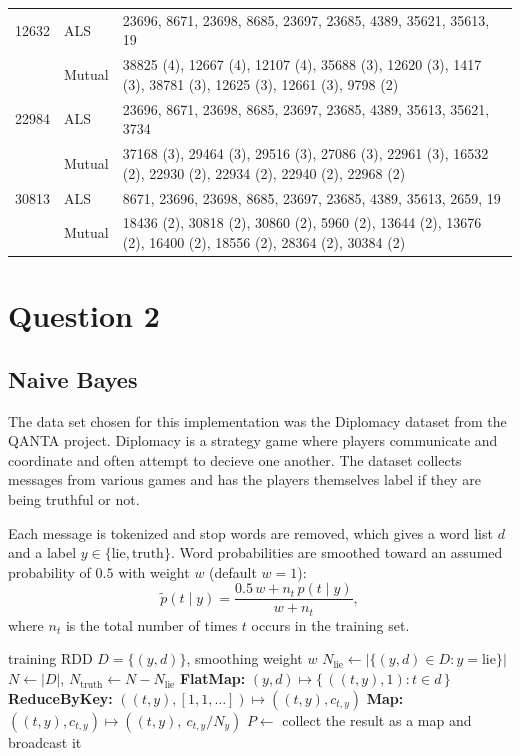\documentclass[11pt]{article}
\begin{document}
{\begin{longtable}{|r|l|p{}|}
    12632 & ALS & 23696, 8671, 23698, 8685, 23697, 23685, 4389,
    35621, 35613, 19 \\
    & Mutual & 38825 (4), 12667 (4), 12107 (4), 35688 (3), 12620 (3),
    1417 (3), 38781 (3), 12625 (3), 12661 (3), 9798 (2) \\ \hline
    22984 & ALS & 23696, 8671, 23698, 8685, 23697, 23685, 4389,
    35613, 35621, 3734 \\
    & Mutual & 37168 (3), 29464 (3), 29516 (3), 27086 (3), 22961 (3),
    16532 (2), 22930 (2), 22934 (2), 22940 (2), 22968 (2) \\ \hline
    30813 & ALS & 8671, 23696, 23698, 8685, 23697, 23685, 4389,
    35613, 2659, 19 \\
    & Mutual & 18436 (2), 30818 (2), 30860 (2), 5960 (2), 13644 (2),
    13676 (2), 16400 (2), 18556 (2), 28364 (2), 30384 (2) \\ \hline
  \end{longtable}
}

\section{Question 2}

\subsection*{Naive Bayes}
The data set chosen for this implementation was the Diplomacy dataset
from the QANTA project. Diplomacy is a strategy game where players
communicate and coordinate and often attempt to decieve one another.
The dataset collects messages from various games and has the players
themselves label if they are being truthful or not.

Each message is tokenized and stop words are removed, which gives a
word list $d$ and a label $y \in \{\text{lie}, \text{truth}\}$.
Word probabilities are smoothed toward an assumed probability of
$0.5$ with weight $w$ (default $w = 1$):
\[
  \tilde{p}(t \mid y) = \frac{0.5\,w + n_t\, p(t \mid y)}{w + n_t},
\]
where $n_t$ is the total number of times $t$ occurs in the training set.

\begin{algorithm}[H]
  \caption{\textsc{Fit}$(D, w)$}
  \begin{algorithmic}[1]
    \REQUIRE training RDD $D = \{(y, d)\}$, smoothing weight $w$
    \STATE $N_{\text{lie}} \leftarrow |\{(y, d) \in D : y = \text{lie}\}|$
    \STATE $N \leftarrow |D|$, \quad $N_{\text{truth}} \leftarrow N -
    N_{\text{lie}}$
    \STATE \textbf{FlatMap:} $(y, d) \mapsto \{\, ((t, y), 1) : t \in d \,\}$
    \STATE \textbf{ReduceByKey:} $((t, y), [1, 1, \dots]) \mapsto
    ((t, y), c_{t,y})$
    \STATE \textbf{Map:} $((t, y), c_{t,y}) \mapsto ((t, y),\ c_{t,y}
    / N_y)$ 
    \STATE $P \leftarrow$ collect the result as a map and broadcast it
  \end{algorithmic}
\end{algorithm}
\end{document}
